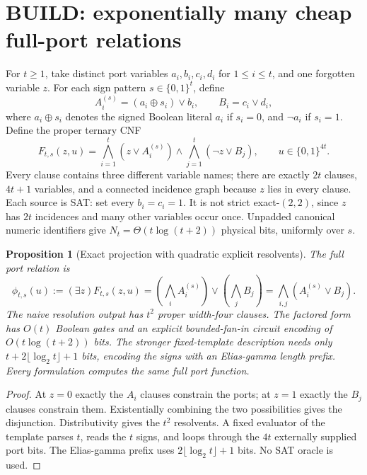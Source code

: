 \documentclass[11pt]{article}
\newtheorem{proposition}[theorem]{Proposition}
\begin{document}
\section{BUILD: exponentially many cheap full-port relations}
For $t\ge1$, take distinct port variables $a_i,b_i,c_i,d_i$ for $1\le i\le t$, and one forgotten variable $z$. For each sign pattern $s\in\{0,1\}^t$, define
\[
 A_i^{(s)}=(a_i\oplus s_i)\lor b_i,
 \qquad B_i=c_i\lor d_i,
\]
where $a_i\oplus s_i$ denotes the signed Boolean literal $a_i$ if $s_i=0$, and $\neg a_i$ if $s_i=1$. Define the proper ternary CNF
\begin{equation}\label{eq:source}
 F_{t,s}(z,u)=\bigwedge_{i=1}^t(z\lor A_i^{(s)})
 \land\bigwedge_{j=1}^t(\neg z\lor B_j),
 \qquad u\in\{0,1\}^{4t}.
\end{equation}
Every clause contains three different variable names; there are exactly $2t$ clauses, $4t+1$ variables, and a connected incidence graph because $z$ lies in every clause. Each source is SAT: set every $b_i=c_i=1$. It is not strict exact-$(2,2)$, since $z$ has $2t$ incidences and many other variables occur once. Unpadded canonical numeric identifiers give $N_t=\Theta(t\log(t+2))$ physical bits, uniformly over $s$.

\begin{proposition}[Exact projection with quadratic explicit resolvents]
The full port relation is
\begin{equation}\label{eq:projection}
 \phi_{t,s}(u):=(\exists z)F_{t,s}(z,u)
 =\left(\bigwedge_i A_i^{(s)}\right)\lor\left(\bigwedge_j B_j\right)
 =\bigwedge_{i,j}(A_i^{(s)}\lor B_j).
\end{equation}
The naive resolution output has $t^2$ proper width-four clauses. The factored form has $O(t)$ Boolean gates and an explicit bounded-fan-in circuit encoding of $O(t\log(t+2))$ bits. The stronger fixed-template description needs only $t+2\lfloor\log_2 t\rfloor+1$ bits, encoding the signs with an Elias-gamma length prefix. Every formulation computes the same full port function.
\end{proposition}
\begin{proof}
At $z=0$ exactly the $A_i$ clauses constrain the ports; at $z=1$ exactly the $B_j$ clauses constrain them. Existentially combining the two possibilities gives the disjunction. Distributivity gives the $t^2$ resolvents. A fixed evaluator of the template parses $t$, reads the $t$ signs, and loops through the $4t$ externally supplied port bits. The Elias-gamma prefix uses $2\lfloor\log_2t\rfloor+1$ bits. No SAT oracle is used.
\end{proof}
\end{document}
